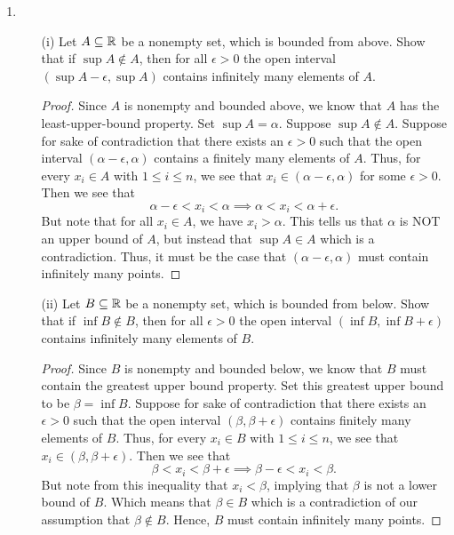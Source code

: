 \documentclass[11pt,a4paper]{article}
\begin{document}
\begin{enumerate}
\begin{proof}
\end{proof}
\item \begin{enumerate}
    \item[(i)] Let \( A \subseteq \mathbb{R}   \) be a nonempty set, which is bounded from above. Show that if \( \sup A \notin A  \), then for all \( \epsilon > 0  \) the open interval \( (\sup A - \epsilon, \sup A ) \) contains infinitely many elements of \( A  \).
        \begin{proof}
        Since \( A  \) is nonempty and bounded above, we know that \( A  \) has the least-upper-bound property. Set \( \sup A = \alpha  \). Suppose \( \sup A \notin A  \). Suppose for sake of contradiction that there exists an \( \epsilon > 0  \) such that the open interval \( (\alpha - \epsilon, \alpha ) \) contains a finitely many elements of \( A  \). Thus, for every \( {x}_{i} \in A  \) with \( 1 \leq i \leq n  \), we see that \( {x}_{i} \in (\alpha - \epsilon, \alpha )   \) for some \( \epsilon > 0 \). Then we see that
        \[  \alpha - \epsilon < {x}_{i} < \alpha \implies \alpha < {x}_{i} < \alpha + \epsilon.  \]
        But note that for all \( {x}_{i} \in A  \), we have \( {x}_{i} > \alpha   \). This tells us that \( \alpha  \) is NOT an upper bound of \( A  \), but instead that \( \sup A \in A  \) which is a contradiction. Thus, it must be the case that \( (\alpha - \epsilon, \alpha ) \) must contain infinitely many points.
        \end{proof}
    \item[(ii)] Let \( B \subseteq \mathbb{R}  \) be a nonempty set, which is bounded from below. Show that if \( \inf B \notin B  \), then for all \( \epsilon > 0  \) the open interval \( (\inf B , \inf B + \epsilon ) \) contains infinitely many elements of \( B  \).
        \begin{proof}
        Since \( B  \) is nonempty and bounded below, we know that \( B   \) must contain the greatest upper bound property. Set this greatest upper bound to be \( \beta = \inf B  \). Suppose for sake of contradiction that there exists an \( \epsilon > 0 \) such that the open interval \( (\beta, \beta + \epsilon ) \) contains finitely many elements of \( B  \). Thus, for every \( {x}_{i} \in B  \) with \( 1 \leq i \leq n  \), we see that \( {x}_{i} \in (\beta, \beta + \epsilon ) \). Then we see that 
        \[  \beta < {x}_{i} < \beta + \epsilon \implies \beta - \epsilon < {x}_{i} < \beta.    \]
        But note from this inequality that \( {x}_{i} < \beta   \), implying that \( \beta  \) is not a lower bound of \( B  \). Which means that \( \beta \in B  \) which is a contradiction of our assumption that \( \beta \notin B  \). Hence, \( B  \) must contain infinitely many points.
        \end{proof}
\end{enumerate}


\end{enumerate}
\end{document}
